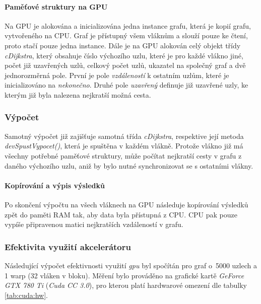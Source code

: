 \paragraph{Paměťové struktury na GPU}
Na GPU je alokována a inicializována jedna instance grafu, která je kopií grafu, vytvořeného na CPU. Graf je přístupný všem vláknům a slouží pouze ke čtení, proto stačí pouze jedna instance. Dále je na GPU alokován celý objekt třídy \textit{cDijkstra}, který obsahuje číslo výchozího uzlu, které je pro každé vlákno jiné, počet již uzavřených uzlů, celkový počet uzlů, ukazatel na společný graf a dvě jednorozměrná pole. První je pole \textit{vzdáleností} k ostatním uzlům, které je inicializováno na \textit{nekonečno}. Druhé pole \textit{uzavřený} definuje již uzavřené uzly, ke kterým již byla nalezena nejkratší možná cesta.



\subsubsection{Výpočet}
Samotný výpočet již zajišťuje samotná třída \textit{cDijkstra}, respektive její metoda \textit{devSpustVypocet()}, která je spuštěna v každém vlákně. Protože vlákno již má všechny potřebné paměťové struktury, může počítat nejkratší cesty v grafu z daného výchozího uzlu, aniž by bylo nutné synchronizovat se s ostatními vlákny.

\paragraph{Kopírování a výpis výsledků}
Po skončení výpočtu na všech vláknech na GPU následuje kopírování výsledků zpět do paměti RAM tak, aby data byla přístupná z CPU. CPU pak pouze vypíše připravenou matici nejkratších vzdáleností v grafu.


\subsubsection{Efektivita využití akcelerátoru} \label{l:cuda:dijkstra:efektivita}
Následující výpočet efektivnosti využití \emph{gpu} byl spočítán pro graf o~5000 uzlech a 1 warp (32 vláken v bloku).
Měření bylo prováděno na grafické kartě \emph{GeForce GTX 780 Ti} (\emph{Cuda CC 3.0}), pro kterou platí hardwarové omezení 
dle tabulky \ref{tab:cuda:hw}.

